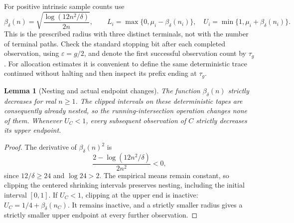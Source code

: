 \documentclass{article}
\theoremstyle{plain}
\newtheorem{lemma}[theorem]{Lemma}
\theoremstyle{definition}
\begin{document}
For positive intrinsic sample counts use
\begin{equation}
 \beta_\delta(n)=\sqrt{\frac{\log(12n^2/\delta)}{2n}},\qquad
 L_i=\max\{0,\mu_i-\beta_\delta(n_i)\},\quad
 U_i=\min\{1,\mu_i+\beta_\delta(n_i)\}.
 \label{eq:v2radius}
\end{equation}
This is the prescribed radius with three distinct terminals, not with the
number of terminal paths. Check the standard stopping bit after each
completed observation, using $\varepsilon=g/2$, and denote the first
successful observation count by $\tau_g$. For allocation estimates it
is convenient to define the same deterministic trace continued without
halting and then inspect its prefix ending at $\tau_g$.

\begin{lemma}[Nesting and actual endpoint changes]
\label{lem:v2strict}
The function $\beta_\delta(n)$ strictly decreases for real $n\ge1$.
The clipped intervals on these deterministic tapes are consequently
already nested, so the running-intersection operation changes none of
them. Whenever $U_C<1$, every subsequent observation of $C$ strictly
decreases its upper endpoint.
\end{lemma}
\begin{proof}
The derivative of $\beta_\delta(n)^2$ is
\[
 \frac{2-\log(12n^2/\delta)}{2n^2}<0,
\]
since $12/\delta\ge24$ and $\log24>2$. The empirical means remain
constant, so clipping the centered shrinking intervals preserves
nesting, including the initial interval $[0,1]$. If $U_C<1$, clipping
at the upper end is inactive: $U_C=1/4+\beta_\delta(n_C)$. It remains
inactive, and a strictly smaller radius gives a strictly smaller upper
endpoint at every further observation.
\end{proof}
\end{document}
